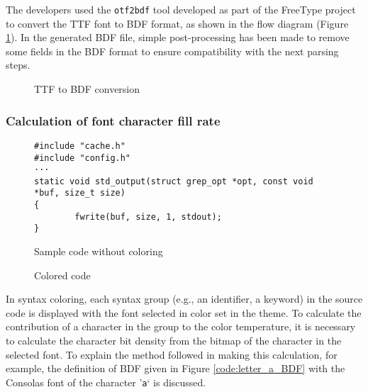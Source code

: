 \documentclass{article}
\begin{document}
The developers used the \texttt{otf2bdf} tool\cite{otf2bdf2008man} developed as part of the FreeType project\cite{freetype2022project} to convert the TTF font to BDF format, as shown in the flow diagram (Figure \ref{fig:otf2bdf}). In the generated BDF file, simple post-processing has been made to remove some fields in the BDF format to ensure compatibility with the next parsing steps.

\begin{figure}[H]
  \caption{TTF to BDF conversion}
  \label{fig:otf2bdf}

\end{figure}

\subsubsection{Calculation of font character fill rate}

\begin{figure}[htb]
  \centering
  \begin{BVerbatim}
#include "cache.h"
#include "config.h"
···
static void std_output(struct grep_opt *opt, const void *buf, size_t size)
{
        fwrite(buf, size, 1, stdout);
}
  \end{BVerbatim}
  \caption{Sample code without coloring}
  \label{code:string}
\end{figure}

\begin{figure}[h]
  \centering
  
  \caption{Colored code}
  \label{fig:code}
\end{figure}

In syntax coloring, each syntax group (e.g., an identifier, a keyword) in the source code is displayed with the font
selected in color set in the theme. To calculate the contribution of a character in the group to the color temperature,
it is necessary to calculate the character bit density from the bitmap of the character in the selected font. To explain
the method followed in making this calculation, for example, the definition of BDF given in Figure
\ref{code:letter_a_BDF} with the Consolas font of the character '\texttt{a}` is discussed.
\end{document}
